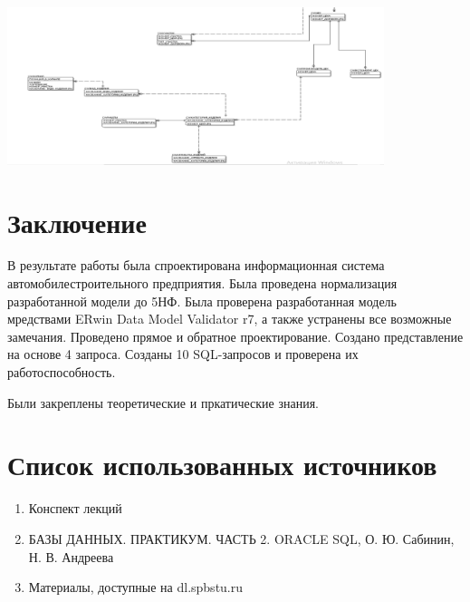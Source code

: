     \includegraphics[width=11cm]{./screenshots/model/reverse2.png}

\section{Заключение}
В результате работы была спроектирована информационная система автомобилестроительного предприятия.
Была проведена нормализация разработанной модели до 5НФ.
Была проверена разработанная модель мредствами ERwin Data Model Validator r7, а также устранены все возможные замечания.
Проведено прямое и обратное проектирование.
Создано представление на основе 4 запроса.
Созданы 10 SQL-запросов и проверена их работоспособность.

Были закреплены теоретические и пркатические знания.

\section{Список использованных источников}

\begin{enumerate}

    \item Конспект лекций
    \item БАЗЫ ДАННЫХ. ПРАКТИКУМ. ЧАСТЬ 2. ORACLE SQL, О. Ю. Сабинин, Н. В. Андреева
    \item Материалы, доступные на dl.spbstu.ru

\end{enumerate}

